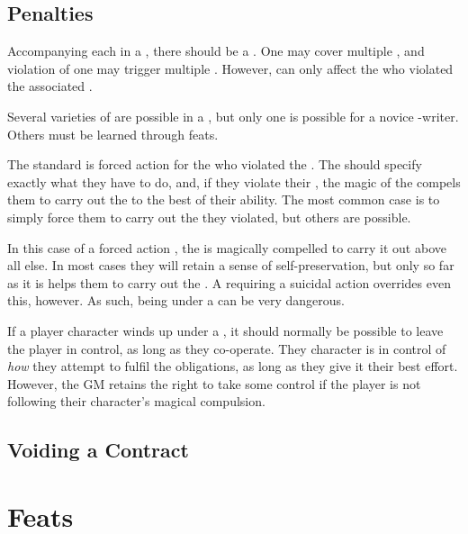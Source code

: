 \subsection{Penalties}

Accompanying each {\stipulation} in a {\contract}, there should be a {\contractpenalty}.
One {\contractpenalty} may cover multiple {\stipulations}, and violation of one {\stipulation} may trigger multiple {\penalties}.
However, {\penalties} can only affect the {\signatories} who violated the associated {\stipulations}.

Several varieties of {\contractpenalty} are possible in a {\contract}, but only one is possible for a novice {\contract}-writer.
Others must be learned through feats.

The standard {\contractpenalty} is forced action for the {\signatory} who violated the {\stipulation}.
The {\contract} should specify exactly what they have to do, and, if they violate their {\stipulation}, the magic of the {\contract} compels them to carry out the {\contractpenalty} to the best of their ability.
The most common case is to simply force them to carry out the {\stipulation} they violated, but others are possible.

In this case of a forced action {\contractpenalty}, the {\penalised} {\signatory} is magically compelled to carry it out above all else.
In most cases they will retain a sense of self-preservation, but only so far as it is helps them to carry out the {\contractpenalty}.
A {\contractpenalty} requiring a suicidal action overrides even this, however.
As such, being under a {\contractpenalty} can be very dangerous.

If a player character winds up under a {\contractpenalty}, it should normally be possible to leave the player in control, as long as they co-operate.
They character is in control of \emph{how} they attempt to fulfil the {\penaltypossessive} obligations, as long as they give it their best effort.
However, the GM retains the right to take some control if the player is not following their character's magical compulsion.

\subsection{Voiding a Contract}

\section{Feats}

